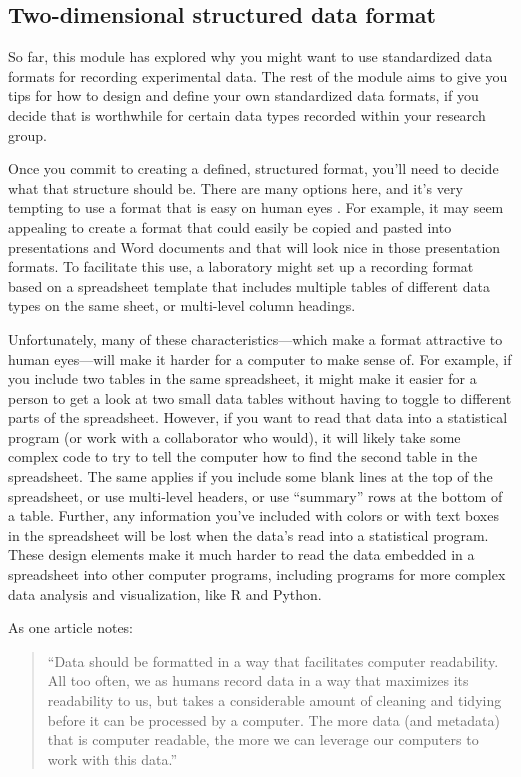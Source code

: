 \documentclass[]{tufte-book}
\begin{document}
\subsection{Two-dimensional structured data format}\label{two-dimensional-structured-data-format}

So far, this module has explored why you might want to use standardized
data formats for recording experimental data. The rest of the module
aims to give you tips for how to design and define your own standardized
data formats, if you decide that is worthwhile for certain data types
recorded within your research group.

Once you commit to creating a defined, structured format, you'll need to decide
what that structure should be. There are many options here, and it's very
tempting to use a format that is easy on human eyes
\citep{buffalo2015bioinformatics}. For example, it may seem appealing to create a
format that could easily be copied and pasted into presentations and Word
documents and that will look nice in those presentation formats. To facilitate
this use, a laboratory might set up a recording format based on a spreadsheet
template that includes multiple tables of different data types on the same
sheet, or multi-level column headings.

Unfortunately, many of these characteristics---which make a format attractive to
human eyes---will make it harder for a computer to make sense of. For example,
if you include two tables in the same spreadsheet, it might make it easier for a
person to get a look at two small data tables without having to toggle to
different parts of the spreadsheet. However, if you want to read that data into
a statistical program (or work with a collaborator who would), it will likely
take some complex code to try to tell the computer how to find the second table
in the spreadsheet. The same applies if you include some blank lines at the top
of the spreadsheet, or use multi-level headers, or use ``summary'' rows at the
bottom of a table. Further, any information you've included with colors or with
text boxes in the spreadsheet will be lost when the data's read into a
statistical program. These design elements make it much harder to read the data
embedded in a spreadsheet into other computer programs, including programs for
more complex data analysis and visualization, like R and Python.

As one article notes:

\begin{quote}
``Data should be formatted in a way that facilitates computer readability. All
too often, we as humans record data in a way that maximizes its readability to
us, but takes a considerable amount of cleaning and tidying before it can be
processed by a computer. The more data (and metadata) that is computer readable,
the more we can leverage our computers to work with this data.'' \citep{buffalo2015bioinformatics}
\end{quote}
\end{document}
